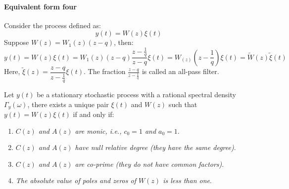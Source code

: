 \paragraph*{Equivalent form four}
Consider the process defined as:
\[y(t)=W(z)\xi(t)\]
Suppose $W(z)=W_1(z)(z-q)$, then:
\[y(t)=W(z)\xi(t)=W_1(z)(z-q)\dfrac{z-\frac{1}{q}}{z-q}\xi(t)=W_(z)\left(z-\dfrac{1}{q}\right)\xi(t)=\tilde{W}(z)\tilde{\xi}(t)\]
Here, $\tilde{\xi}(z)=\dfrac{z-q}{z-\frac{1}{q}}\xi(t)$. 
The fraction $\frac{z-q}{z-\frac{1}{q}}$ is called an all-pass filter.

\begin{theorem}
    Let $y(t)$ be a stationary stochastic process with a rational spectral density $\Gamma_y(\omega)$, there exists a unique pair $\xi(t)$ and $W(z)$ such that $y(t)=W(z)\xi(t)$ if and only if:
\end{theorem}
\begin{enumerate}
    \item \textit{$C(z)$ and $A(z)$ are monic, i.e., $c_0=1$ and $a_0=1$}. 
    \item \textit{$C(z)$ and $A(z)$ have null relative degree (they have the same degree)}.
    \item \textit{$C(z)$ and $A(z)$ are co-prime (they do not have common factors)}.
    \item \textit{The absolute value of poles and zeros of $W(z)$ is less than one}.
\end{enumerate}